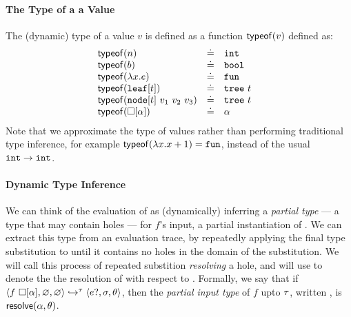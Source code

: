 \paragraph{The Type of a a Value} The (dynamic) type of a
value $v$ is defined as a function $\mathsf{typeof}(v)$ defined as:
  \[
  \begin{array}{lcll}
    \mathsf{typeof}(n)   & \doteq & \mathtt{int} & \\
    \mathsf{typeof}(b)   & \doteq & \mathtt{bool} & \\
    \mathsf{typeof}(\lambda x. e) & \doteq & \mathtt{fun} \\
    \mathsf{typeof}(\mathtt{leaf}[t]) & \doteq & \mathtt{tree}\ t \\
    \mathsf{typeof}(\mathtt{node}[t]\ v_1\ v_2\ v_3) & \doteq & \mathtt{tree}\ t \\
    \mathsf{typeof}(\square[\alpha]) & \doteq & \alpha \\
  \end{array}
  \]
%
Note that we approximate the type of values rather than
performing traditional type inference, for example
$\mathsf{typeof}(\lambda x. x + 1) = \mathtt{fun}$,
instead of the usual $\mathtt{int} \rightarrow \mathtt{int}$.

\paragraph{Dynamic Type Inference}
We can think of the evaluation of  as (dynamically)
inferring a \emph{partial type} --- a type that may contain holes ---
for $f$'s input, \ie a partial instantiation of \thole.
%
We can extract this type from an evaluation trace, by repeatedly
applying the final type substitution to \thole until it contains no
holes in the domain of the substitution. We will call this process of
repeated substition \emph{resolving} a hole, and will use
\resolve{\thole}{\tsu} to denote the the resolution of \thole with
respect to \tsu.
%
Formally, we say that if
$\langle f\ \square[\alpha], \varnothing, \varnothing \rangle \hookrightarrow^{\tau} \langle e?, \sigma, \theta \rangle$,
then the \emph{partial input type} of $f$ upto $\tau$, written
, is
$\mathsf{resolve}(\alpha, \theta)$.
%

